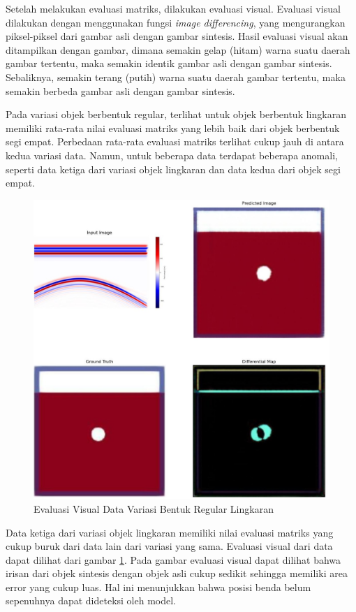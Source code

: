 Setelah melakukan evaluasi matriks, dilakukan evaluasi visual. 
Evaluasi visual dilakukan dengan menggunakan fungsi \emph{image differencing}, yang mengurangkan piksel-piksel dari gambar asli dengan gambar sintesis. 
Hasil evaluasi visual akan ditampilkan dengan gambar, dimana semakin gelap (hitam) warna suatu daerah gambar tertentu, maka semakin identik gambar asli dengan gambar sintesis. 
Sebaliknya, semakin terang (putih) warna suatu daerah gambar tertentu, maka semakin berbeda gambar asli dengan gambar sintesis.

Pada variasi objek berbentuk regular, terlihat untuk objek berbentuk lingkaran memiliki rata-rata nilai evaluasi matriks yang lebih baik dari objek berbentuk segi empat. 
Perbedaan rata-rata evaluasi matriks terlihat cukup jauh di antara kedua variasi data. 
Namun, untuk beberapa data terdapat beberapa anomali, seperti data ketiga dari variasi objek lingkaran dan data kedua dari objek segi empat. 

\begin{figure}[ht]
  \centering
  \includegraphics[scale=0.15]{gambar/diffMapLingkaran.jpg}
  \caption{Evaluasi Visual Data Variasi Bentuk Regular Lingkaran}
  \label{fig:diffmaplingkaran}
\end{figure}

Data ketiga dari variasi objek lingkaran memiliki nilai evaluasi matriks yang cukup buruk dari data lain dari variasi yang sama. 
Evaluasi visual dari data dapat dilihat dari gambar \ref{fig:diffmaplingkaran}. 
Pada gambar evaluasi visual dapat dilihat bahwa irisan dari objek sintesis dengan objek asli cukup sedikit sehingga memiliki area error yang cukup luas. 
Hal ini menunjukkan bahwa posisi benda belum sepenuhnya dapat dideteksi oleh model.

